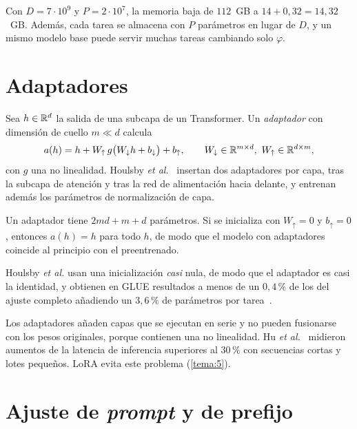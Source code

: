 Con $D=7\cdot 10^{9}$ y $P=2\cdot 10^{7}$, la memoria baja de $112$~GB a $14+0{,}32=14{,}32$~GB. Además, cada tarea se almacena con $P$ parámetros en lugar de $D$, y un mismo modelo base puede servir muchas tareas cambiando solo $\varphi$.

\section{Adaptadores}

\begin{definicion}[Adaptador]\label{def:adaptador}
Sea $h\in\mathbb{R}^{d}$ la salida de una subcapa de un Transformer. Un \emph{adaptador} con dimensión de cuello $m\ll d$ calcula
\[
a(h)=h+W_{\uparrow}\,g\bigl(W_{\downarrow}h+b_{\downarrow}\bigr)+b_{\uparrow},\qquad W_{\downarrow}\in\mathbb{R}^{m\times d},\ W_{\uparrow}\in\mathbb{R}^{d\times m},
\]
con $g$ una no linealidad. Houlsby \emph{et al.}~\cite{houlsby} insertan dos adaptadores por capa, tras la subcapa de atención y tras la red de alimentación hacia delante, y entrenan además los parámetros de normalización de capa.
\end{definicion}

\addtocounter{figure}{1}%

\begin{proposicion}\label{prop:adaptador}
Un adaptador tiene $2md+m+d$ parámetros. Si se inicializa con $W_{\uparrow}=0$ y $b_{\uparrow}=0$, entonces $a(h)=h$ para todo $h$, de modo que el modelo con adaptadores coincide al principio con el preentrenado.
\end{proposicion}

Houlsby \emph{et al.} usan una inicialización \emph{casi} nula, de modo que el adaptador es casi la identidad, y obtienen en GLUE resultados a menos de un $0{,}4\,\%$ de los del ajuste completo añadiendo un $3{,}6\,\%$ de parámetros por tarea~\cite{houlsby}.

\begin{observacion}[Latencia]
Los adaptadores añaden capas que se ejecutan en serie y no pueden fusionarse con los pesos originales, porque contienen una no linealidad. Hu \emph{et al.}~\cite[§3]{hu-lora} midieron aumentos de la latencia de inferencia superiores al $30\,\%$ con secuencias cortas y lotes pequeños. LoRA evita este problema (\cref{tema:5}).
\end{observacion}

\section{Ajuste de \emph{prompt} y de prefijo}

